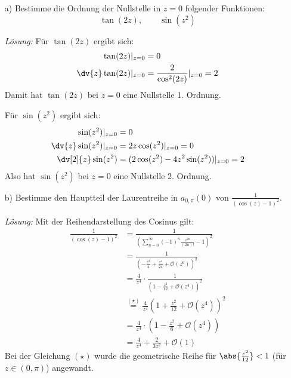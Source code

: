 \documentclass[11pt,a4paper]{article}
\theoremstyle{definition} \newtheorem{theo}{Theorem}[section]
\theoremstyle{definition} \newtheorem{defi}{Definition}[section]
\theoremstyle{definition} \newtheorem{cor}{Corollary}[section]
\theoremstyle{definition} \newtheorem{lemmas}{Lemma}[section]
\theoremstyle{definition} \newtheorem{assp}{Assumption}[section]
\theoremstyle{definition} \newtheorem{exam}{Example}[section]
\theoremstyle{definition} \newtheorem{sol}{Lösung}
\begin{document}
\begin{itemize}
	\item[a)] Bestimme die Ordnung der Nullstelle in $z=0$ folgender Funktionen: $$\tan(2z),\qquad \sin(z^{2})$$ 
	
	\textit{Lösung:} Für $\tan(2z)$ ergibt sich:
	\begin{align*}
		\tan(2z)\vert_{z=0}&=0\\
		\dv{z}\tan(2z)\vert_{z=0}&=\frac{2}{\cos^{2}(2z)}\vert_{z=0}=2\\
	\end{align*}
 	Damit hat $\tan(2z)$ bei $z=0$ eine Nullstelle 1. Ordnung.
	
	Für $\sin(z^{2})$ ergibt sich:
	\begin{align*}
		\sin(z^{2})\vert_{z=0}&=0\\
		\dv{z}\sin(z^{2})\vert_{z=0}&=2z\cos(z^{2})\vert_{z=0}=0\\
		\dv[2]{z}\sin(z^{2})&=(2\cos(z^{2})-4z^{2}\sin(z^{2}))\vert_{z=0}=2\\
	\end{align*}
	Also hat $\sin(z^{2})$ bei $z=0$ eine Nullstelle 2. Ordnung.
	
	\item[b)] Bestimme den Hauptteil der Laurentreihe in $a_{0,\pi}(0)$ von $\frac{1}{(\cos(z)-1)^{2}}$.
	
	\textit{Lösung:} Mit der Reihendarstellung des Cosinus gilt:
	\begin{align*}
		\frac{1}{(\cos(z)-1)^{2}}&=\frac{1}{(\sum_{n=0}^{\infty}(-1)^{n}\frac{z^{2n}}{(2n)!} - 1)^{2}}\\
		&=\frac{1}{(-\frac{z^{2}}{4}+\frac{z^{4}}{24}+\mathcal{O}(z^{6}))^{2}}\\
		&=\frac{4}{z^{4}}\cdot\frac{1}{(1-\frac{z^{2}}{12}+\mathcal{O}(z^{4}))^{2}}\\
		&\overset{(\star)}{=}\frac{4}{z^{4}}\left(1+\frac{z^{2}}{12}+\mathcal{O}(z^{4})\right)^{2}\\
		&=\frac{4}{z^{4}}\cdot \left(1-\frac{z^{2}}{6}+\mathcal{O}(z^{4})\right )\\
		&=\frac{4}{z^{4}}+\frac{2}{3z^{2}}+\mathcal{O}(1)
	\end{align*}
	Bei der Gleichung $(\star)$ wurde die geometrische Reihe für $\abs{\frac{z^{2}}{12}}<1$ (für $z\in (0,\pi)$) angewandt. 
\end{itemize}
\end{document}
